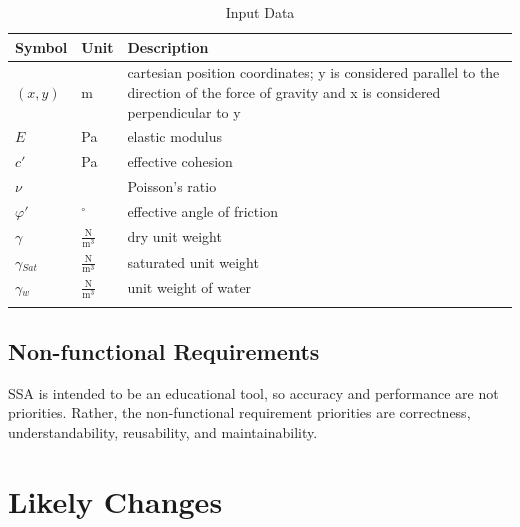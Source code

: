 \documentclass[12pt]{article}
\begin{document}
\begin{longtable}{l l l}
\toprule
Symbol & Unit & Description
\\
\midrule
$(x,y)$ & m & cartesian position coordinates; y is considered parallel to the direction of the force of gravity and x is considered perpendicular to y
\\
$E$ & Pa & elastic modulus
\\
$c'$ & Pa & effective cohesion
\\
$\nu{}$ &  & Poisson's ratio
\\
$\varphi{}'$ & ${}^{\circ}$ & effective angle of friction
\\
$\gamma{}$ & $\frac{\text{N}}{\text{m}^{3}}$ & dry unit weight
\\
$\gamma{}_{Sat}$ & $\frac{\text{N}}{\text{m}^{3}}$ & saturated unit weight
\\
$\gamma{}_{w}$ & $\frac{\text{N}}{\text{m}^{3}}$ & unit weight of water
\\
\bottomrule
\caption{Input Data}
\label{Table:InpuData}
\end{longtable}
\subsection{Non-functional Requirements}
\label{Sec:Non-Requ}
SSA is intended to be an educational tool, so accuracy and performance are not priorities. Rather, the non-functional requirement priorities are correctness, understandability, reusability, and maintainability.
\section{Likely Changes}
\label{Sec:LikeChan}
\end{document}
